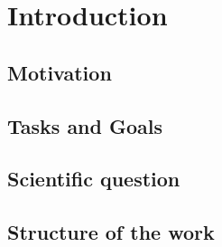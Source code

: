 \chapter{Introduction}
\section{Motivation}
\section{Tasks and Goals}
\section{Scientific question}
\section{Structure of the work}